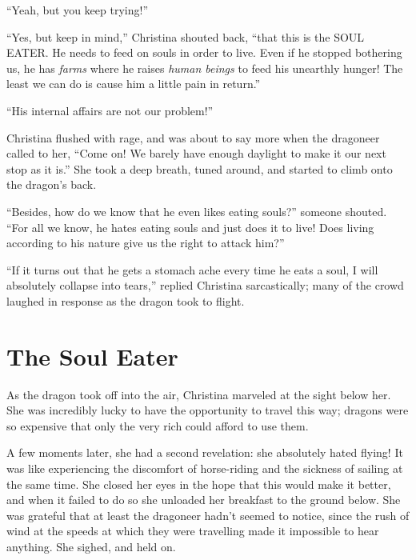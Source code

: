 \documentclass[showtrims,b6paper,draft,10pt]{memoir}
\begin{document}
``Yeah, but you keep trying!''

``Yes, but keep in mind,''  Christina shouted back, ``that this is the SOUL EATER.  He needs to feed on souls in order to live.  Even if he stopped bothering us, he has \emph{farms} where he raises \emph{human beings} to feed his unearthly hunger!  The least we can do is cause him a little pain in return.''

``His internal affairs are not our problem!''

Christina flushed with rage, and was about to say more when the dragoneer called to her, ``Come on!  We barely have enough daylight to make it our next stop as it is.''  She took a deep breath, tuned around, and started to climb onto the dragon's back.

``Besides, how do we know that he even likes eating souls?''  someone shouted.  ``For all we know, he hates eating souls and just does it to live!  Does living according to his nature give us the right to attack him?''

``If it turns out that he gets a stomach ache every time he eats a soul, I will absolutely collapse into tears,'' replied Christina sarcastically;  many of the crowd laughed in response as the dragon took to flight.

\timeskip
\chapter{The Soul Eater}

As the dragon took off into the air, Christina marveled at the sight below her.  She was incredibly lucky to have the opportunity to travel this way;  dragons were so expensive that only the very rich could afford to use them.

A few moments later, she had a second revelation:  she absolutely hated flying!  It was like experiencing the discomfort of horse-riding and the sickness of sailing at the same time.  She closed her eyes in the hope that this would make it better, and when it failed to do so she unloaded her breakfast to the ground below.  She was grateful that at least the dragoneer hadn't seemed to notice, since the rush of wind at the speeds at which they were travelling made it impossible to hear anything.  She sighed, and held on.
\end{document}
